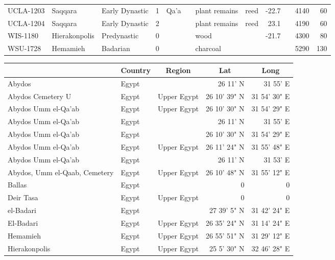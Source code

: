 \documentclass[a4paper,8pt]{article}
\begin{document}
\begin{landscape}
\begin{center}
\begin{longtable}{|l|>{\raggedright}p{20ex}|l|r|l|>{\raggedright}p{25ex}|l|l|r|l|r|r|}
UCLA-1203 & Saqqara & Early Dynastic & 1 & Qa'a &  & plant remains & reed & -22.7 &  & 4140 & 60\\
UCLA-1204 & Saqqara & Early Dynastic & 2 &  &  & plant remains & reed & 23.1 &  & 4190 & 60\\
WIS-1180 & Hierakonpolis & Predynastic & 0 &  &  & wood &  & -21.7 &  & 4300 & 80\\
WSU-1728 & Hemamieh & Badarian & 0 &  &  & charcoal &  &   &  & 5290 & 130\\
\end{longtable}
\end{center}
\end{landscape}
\eject
\begin{landscape}
\small\sf\begin{center}
\begin{longtable}{|>{\raggedright}p{20ex}|l|l|r|r|}
\hline
\multicolumn{1}{|c|}{\parbox[t]{20ex}{\centering Site\vspace{2pt}}} & \multicolumn{1}{c|}{Country} & \multicolumn{1}{c|}{Region} & \multicolumn{1}{c|}{Lat} & \multicolumn{1}{c|}{Long}\\
\hline\endhead\hline\endfoot\hline\hline\endlastfoot
Abydos & Egypt &  & 26 11' N & 31 55' E\\
Abydos Cemetery U & Egypt & Upper Egypt & 26 10' 39" N & 31 54' 30" E\\
Abydos Umm el-Qa'ab & Egypt & Upper Egypt & 26 10' 30" N & 31 54' 29" E\\
Abydos Umm el-Qa'ab & Egypt &  & 26 11' N & 31 55' E\\
Abydos Umm el-Qa'ab & Egypt &  & 26 10' 30" N & 31 54' 29" E\\
Abydos Umm el-Qa'ab & Egypt & Upper Egypt & 26 11' 24" N & 31 55' 48" E\\
Abydos Umm el-Qa'ab & Egypt &  & 26 11' N & 31 53' E\\
Abydos, Umm el-Qaab, Cemetery  & Egypt & Upper Egypt & 26 10' 48" N & 31 55' 12" E\\
Ballas & Egypt &  & 0 & 0\\
Deir Tasa & Egypt & Upper Egypt & 0 & 0\\
el-Badari & Egypt &  & 27 39' 5" N & 31 42' 24" E\\
El-Badari & Egypt & Upper Egypt & 26 35' 24" N & 31 14' 24" E\\
Hemamieh & Egypt & Upper Egypt & 26 55' 51" N & 31 29' 12" E\\
Hierakonpolis & Egypt & Upper Egypt & 25 5' 30" N & 32 46' 28" E\\

\end{longtable}
\end{center}
\end{landscape}
\end{document}
